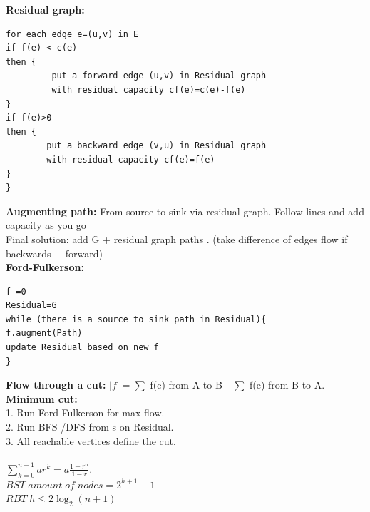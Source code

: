 \documentclass[paper=a4, fontsize=11pt]{scrartcl} %
\begin{document}
\textbf{Residual graph:}
\begin{lstlisting}[frame=single]
for each edge e=(u,v) in E
if f(e) < c(e)	
then {	
	 	 put a forward edge (u,v) in Residual graph
	 	 with residual capacity cf(e)=c(e)-f(e)	
}	
if f(e)>0	
then {	
	 	put a backward edge (v,u) in Residual graph
	 	with residual capacity cf(e)=f(e)	
}	
}	
\end{lstlisting}
\textbf{Augmenting path: }From source to sink via residual graph. Follow lines and add capacity as you go\\
Final solution: add G + residual graph paths . (take difference of edges flow if backwards + forward)\\
\textbf{Ford-Fulkerson:}\\
\begin{lstlisting}[frame=single]
f =0
Residual=G
while (there is a source to sink path in Residual){
f.augment(Path)
update Residual based on new f
}
\end{lstlisting}
\textbf{Flow through a cut: } $|f|=\sum$ f(e) from A to B - $\sum$ f(e) from B to A.\\
\textbf{Minimum cut: } \\
1. Run Ford-Fulkerson for max flow.\\
2. Run BFS /DFS from s on Residual.\\
3. All reachable vertices define the cut.\\
------------------------------------------------\\
$\sum_{k=0}^{n-1}ar^k=a\frac{1-r^n}{1-r}$.\\
$BST \; amount \; of \; nodes=2^{h+1}-1$\\
$RBT \; h \leq 2 \log_2(n+1)$\\
\end{document}
